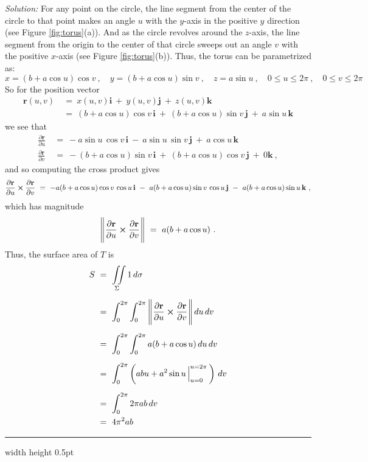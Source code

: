 \begin{exmp}
\par\noindent \emph{Solution:}
For any point on the circle, the line segment from the center of the circle to that point makes an angle $u$ with the
$y$-axis in the positive $y$ direction (see Figure \ref{fig:torus}(a)). And as the circle revolves around the $z$-axis,
the line segment from the origin to the center of that circle sweeps out an angle $v$ with the positive $x$-axis (see
Figure \ref{fig:torus}(b)). Thus, the torus can be parametrized as:
\begin{displaymath}
 x = (b+a\cos u)\cos v ~,\quad y = (b+a\cos u)\sin v ~,\quad z = a\sin u~,\quad 0\le u\le 2\pi~,\quad 0\le v\le 2\pi
\end{displaymath}
So for the position vector
\begin{align*}
 \textbf{r}(u,v) ~&=~ x(u,v) \textbf{i} ~+~ y(u,v) \textbf{j} ~+~ z(u,v) \textbf{k}\\
 &=~ (b+a\cos u)\cos v \,\textbf{i} ~+~ (b+a\cos u)\sin v \,\textbf{j} ~+~ a\sin u \,\textbf{k}
\end{align*}
we see that
\begin{align*}
 \frac{\partial \textbf{r}}{\partial u} ~&=~
  -a\sin u\,\cos v \,\textbf{i} ~-~ a\sin u\,\sin v \,\textbf{j} ~+~ a\cos u \,\textbf{k}\\[6pt]
 \frac{\partial \textbf{r}}{\partial v} ~&=~
  -(b+a\cos u)\sin v \,\textbf{i} ~+~ (b+a\cos u)\cos v \,\textbf{j} ~+~ 0 \textbf{k} ~,
\end{align*}
and so computing the cross product gives
\begin{displaymath}
 \frac{\partial \textbf{r}}{\partial u} \bm{\times} \frac{\partial \textbf{r}}{\partial v} ~=~
  -a(b+a\cos u)\cos v\,\cos u \,\textbf{i} ~-~ a(b+a\cos u)\sin v\,\cos u\,\textbf{j} ~-~ a(b+a\cos u)\sin u \,\textbf{k} ~,
\end{displaymath}
which has magnitude
\begin{displaymath}
 \Biggl\lVert\mspace{1mu}\frac{\partial \textbf{r}}{\partial u} \bm{\times} \frac{\partial \textbf{r}}{\partial v}\mspace{1mu}\Biggr\rVert ~=~ a(b+a\cos u) ~.
\end{displaymath}
Thus, the surface area of $T$ is
\begin{align*}
 S ~&=~ \iint\limits_{\Sigma} 1\,d\sigma\\[6pt]
  &=~ \int_0^{2\pi} \int_0^{2\pi}\,\Biggl\lVert\mspace{1mu}\frac{\partial \textbf{r}}{\partial u} \bm{\times} \frac{\partial
  \textbf{r}}{\partial v}\mspace{1mu}\Biggr\rVert\,du\,dv\\[6pt]
  &=~ \int_0^{2\pi} \int_0^{2\pi} a(b+a\cos u)\,du\,dv\\[6pt]
  &=~ \int_0^{2\pi} \left( abu + a^2 \sin u \,\Big|_{u=0}^{u=2\pi}\,\right)\,dv\\[6pt]
  &=~ \int_0^{2\pi} 2\pi ab\,dv\\
  &=~ 4\pi^2 ab
\end{align*}
\end{exmp}
\hrule width \textwidth height 0.5pt
\vspace{3mm}

